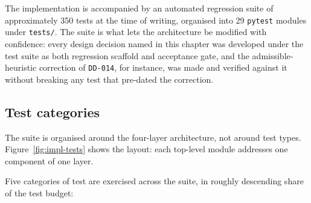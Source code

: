 The implementation is accompanied by an automated regression suite of
approximately 350 tests at the time of writing, organised
into 29 \texttt{pytest} modules under \texttt{tests/}. The suite is
what lets the architecture be modified with confidence: every design
decision named in this chapter was developed under the test suite as
both regression scaffold and acceptance gate, and the admissible-heuristic
correction of \texttt{DD-014}, for instance, was made and verified
against it without breaking any test that pre-dated the correction.

\subsection{Test categories}

The suite is organised around the four-layer architecture, not around
test types. Figure~\ref{fig:impl-tests} shows the layout: each
top-level module addresses one component of one layer.


Five categories of test are exercised across the suite, in roughly
descending share of the test budget:

